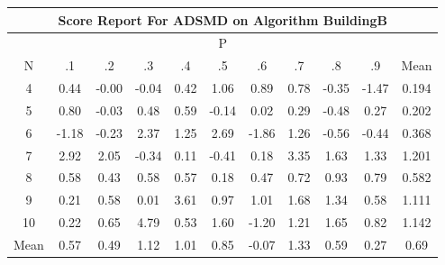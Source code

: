 \documentclass[11pt,a4paper]{report}
\begin{document}
\begin{longtable}{ | c || c | c | c | c | c | c | c | c | c || c |}
\hline
\multicolumn{11}{|c|}{ Score Report For ADSMD on Algorithm BuildingB} \\
\hline
\multicolumn{11}{|c|}{ P } \\
\hline
N & .1 & .2 & .3 & .4 & .5 & .6 & .7 & .8 & .9 & Mean\\
 \hline
 \hline
 \endhead
  4 &  \cellcolor[HTML]{F7F7FF} 0.44 &  \cellcolor[HTML]{FFFFFF} -0.00 &  \cellcolor[HTML]{FFFFFF} -0.04 &  \cellcolor[HTML]{F7F7FF} 0.42 &  \cellcolor[HTML]{E7E7FF} 1.06 &  \cellcolor[HTML]{E7E7FF} 0.89 &  \cellcolor[HTML]{EFEFFF} 0.78 &  \cellcolor[HTML]{FFF7F7} -0.35 &  \cellcolor[HTML]{FFD7D7} -1.47 & 0.194 \\
  5 &  \cellcolor[HTML]{E7E7FF} 0.80 &  \cellcolor[HTML]{FFFFFF} -0.03 &  \cellcolor[HTML]{EFEFFF} 0.48 &  \cellcolor[HTML]{EFEFFF} 0.59 &  \cellcolor[HTML]{FFFFFF} -0.14 &  \cellcolor[HTML]{FFFFFF} 0.02 &  \cellcolor[HTML]{F7F7FF} 0.29 &  \cellcolor[HTML]{FFEFEF} -0.48 &  \cellcolor[HTML]{F7F7FF} 0.27 & 0.202 \\
  6 &  \cellcolor[HTML]{FFDFDF} -1.18 &  \cellcolor[HTML]{FFF7F7} -0.23 &  \cellcolor[HTML]{C7C7FF} 2.37 &  \cellcolor[HTML]{DFDFFF} 1.25 &  \cellcolor[HTML]{BFBFFF} 2.69 &  \cellcolor[HTML]{FFCFCF} -1.86 &  \cellcolor[HTML]{DFDFFF} 1.26 &  \cellcolor[HTML]{FFEFEF} -0.56 &  \cellcolor[HTML]{FFF7F7} -0.44 & 0.368 \\
  7 &  \cellcolor[HTML]{B7B7FF} 2.92 &  \cellcolor[HTML]{CFCFFF} 2.05 &  \cellcolor[HTML]{FFF7F7} -0.34 &  \cellcolor[HTML]{FFFFFF} 0.11 &  \cellcolor[HTML]{FFF7F7} -0.41 &  \cellcolor[HTML]{F7F7FF} 0.18 &  \cellcolor[HTML]{A7A7FF} 3.35 &  \cellcolor[HTML]{D7D7FF} 1.63 &  \cellcolor[HTML]{DFDFFF} 1.33 & 1.201 \\
  8 &  \cellcolor[HTML]{EFEFFF} 0.58 &  \cellcolor[HTML]{F7F7FF} 0.43 &  \cellcolor[HTML]{EFEFFF} 0.58 &  \cellcolor[HTML]{EFEFFF} 0.57 &  \cellcolor[HTML]{F7F7FF} 0.18 &  \cellcolor[HTML]{F7F7FF} 0.47 &  \cellcolor[HTML]{EFEFFF} 0.72 &  \cellcolor[HTML]{E7E7FF} 0.93 &  \cellcolor[HTML]{EFEFFF} 0.79 & 0.582 \\
  9 &  \cellcolor[HTML]{F7F7FF} 0.21 &  \cellcolor[HTML]{EFEFFF} 0.58 &  \cellcolor[HTML]{FFFFFF} 0.01 &  \cellcolor[HTML]{A7A7FF} 3.61 &  \cellcolor[HTML]{E7E7FF} 0.97 &  \cellcolor[HTML]{E7E7FF} 1.01 &  \cellcolor[HTML]{D7D7FF} 1.68 &  \cellcolor[HTML]{DFDFFF} 1.34 &  \cellcolor[HTML]{EFEFFF} 0.58 & 1.111 \\
  10 &  \cellcolor[HTML]{F7F7FF} 0.22 &  \cellcolor[HTML]{EFEFFF} 0.65 &  \cellcolor[HTML]{8787FF} 4.79 &  \cellcolor[HTML]{EFEFFF} 0.53 &  \cellcolor[HTML]{D7D7FF} 1.60 &  \cellcolor[HTML]{FFDFDF} -1.20 &  \cellcolor[HTML]{DFDFFF} 1.21 &  \cellcolor[HTML]{D7D7FF} 1.65 &  \cellcolor[HTML]{E7E7FF} 0.82 & 1.142 \\
 \hline
 \hline
Mean &  \cellcolor[HTML]{EFEFFF} 0.57 &  \cellcolor[HTML]{EFEFFF} 0.49 &  \cellcolor[HTML]{DFDFFF} 1.12 &  \cellcolor[HTML]{E7E7FF} 1.01 &  \cellcolor[HTML]{E7E7FF} 0.85 &  \cellcolor[HTML]{FFFFFF} -0.07 &  \cellcolor[HTML]{DFDFFF} 1.33 &  \cellcolor[HTML]{EFEFFF} 0.59 &  \cellcolor[HTML]{F7F7FF} 0.27 &  \cellcolor[HTML]{EFEFFF} 0.69
\end{longtable}
\end{document}
